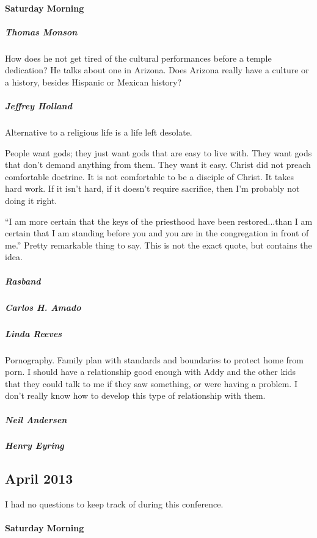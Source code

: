 \paragraph*{Saturday Morning}

\subparagraph*{Thomas Monson}

How does he not get tired of the cultural performances before a temple dedication? He talks about one in Arizona. Does Arizona really have a culture or a history, besides Hispanic or Mexican history?

\subparagraph*{Jeffrey Holland}

Alternative to a religious life is a life left desolate. 

People want gods; they just want gods that are easy to live with. They want gods that don't demand anything from them. They want it easy. Christ did not preach comfortable doctrine. It is not comfortable to be a disciple of Christ. It takes hard work. If it isn't hard, if it doesn't require sacrifice, then I'm probably not doing it right.

``I am more certain that the keys of the priesthood have been restored...than I am certain that I am standing before you and you are in the congregation in front of me.'' Pretty remarkable thing to say. This is not the exact quote, but contains the idea.

\subparagraph*{Rasband}

\subparagraph*{Carlos H. Amado}

\subparagraph*{Linda Reeves}

Pornography. Family plan with standards and boundaries to protect home from porn. I should have a relationship good enough with Addy and the other kids that they could talk to me if they saw something, or were having a problem. I don't really know how to develop this type of relationship with them.

\subparagraph*{Neil Andersen}

\subparagraph*{Henry Eyring}

\subsection{April 2013}

I had no questions to keep track of during this conference.

\paragraph*{Saturday Morning}


